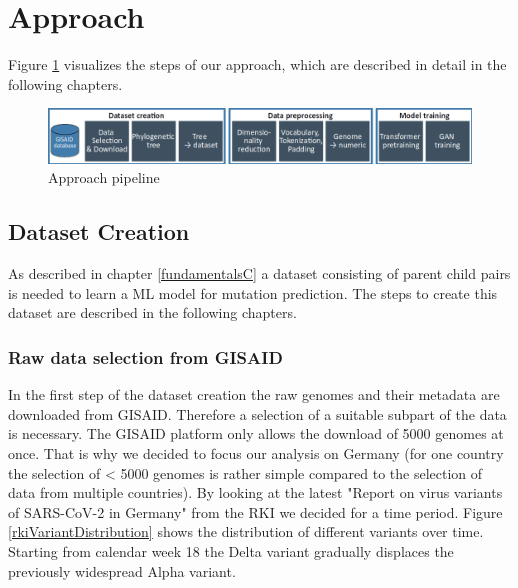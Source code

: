 \section{Approach} 
\label{approach}

Figure \ref{pipeline} visualizes the steps of our approach, which are described in detail in the following chapters.

\begin{figure}[ht]
	\centering
	\includegraphics[width=1.0\linewidth]{figures/pipeline.png}
	\caption{Approach pipeline \cite{own representation}}
	\label{pipeline}
\end{figure}


\subsection{Dataset Creation}  \label{ch:approachA}

As described in chapter \ref{fundamentalsC} a dataset consisting of parent child pairs is needed to learn a \ac{ML} model for mutation prediction. The steps to create this dataset are described in the following chapters.

\subsubsection{Raw data selection from \ac{GISAID}}
\label{ch:approachAa}

In the first step of the dataset creation the raw genomes and their metadata are downloaded from \ac{GISAID}. Therefore a selection of a suitable subpart of the data is necessary. The \ac{GISAID} platform only allows the download of 5000 genomes at once. That is why we decided to focus our analysis on Germany (for one country the selection of < 5000 genomes is rather simple compared to the selection of data from multiple countries). By looking at the latest "Report on virus variants of SARS-CoV-2 in Germany" from the \ac{RKI} we decided for a time period. Figure \ref{rkiVariantDistribution} shows the distribution of different variants over time. Starting from calendar week 18 the Delta variant gradually displaces the previously widespread Alpha variant.

